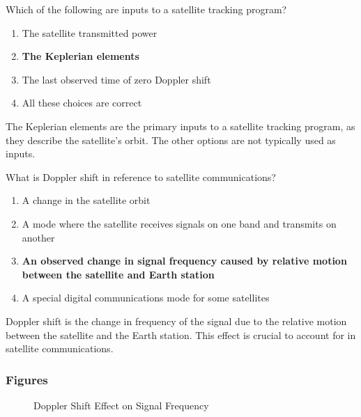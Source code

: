 \begin{tcolorbox}[colback=gray!10!white,colframe=black!75!black,title={T8B06}]
Which of the following are inputs to a satellite tracking program?
\begin{enumerate}[label=\Alph*),noitemsep]
    \item The satellite transmitted power
    \item \textbf{The Keplerian elements}
    \item The last observed time of zero Doppler shift
    \item All these choices are correct
\end{enumerate}
\end{tcolorbox}
The Keplerian elements are the primary inputs to a satellite tracking program, as they describe the satellite's orbit. The other options are not typically used as inputs.

\begin{tcolorbox}[colback=gray!10!white,colframe=black!75!black,title={T8B07}]
What is Doppler shift in reference to satellite communications?
\begin{enumerate}[label=\Alph*),noitemsep]
    \item A change in the satellite orbit
    \item A mode where the satellite receives signals on one band and transmits on another
    \item \textbf{An observed change in signal frequency caused by relative motion between the satellite and Earth station}
    \item A special digital communications mode for some satellites
\end{enumerate}
\end{tcolorbox}
Doppler shift is the change in frequency of the signal due to the relative motion between the satellite and the Earth station. This effect is crucial to account for in satellite communications.

\subsubsection*{Figures}

\begin{figure}[h!]
    \centering
    \caption{Doppler Shift Effect on Signal Frequency}
    \label{fig:doppler-shift}
\end{figure}

